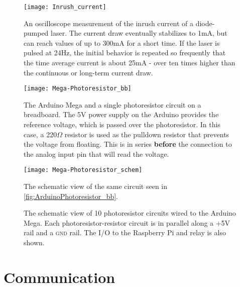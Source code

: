 \documentclass[11pt,oneside,final,letterpaper]{memoir}
\begin{document}
\begin{figure}[H]
    \centering
    \texttt{[image: Inrush\_current]}
    \caption[Oscilloscope measurement of inrush current]{
        An oscilloscope measurement of the inrush current of a diode-pumped laser.  The current draw eventually stabilizes to 1mA, but can reach values of up to 300mA for a short time.  If the laser is pulsed at 24Hz, the initial behavior is repeated so frequently that the time average current is about 25mA - over ten times higher than the continuous or long-term current draw.
    } \label{fig:InrushCurrent}
\end{figure}

\begin{figure}[H]
    \centering
    \texttt{[image: Mega-Photoresistor\_bb]}
    \caption[Arduino and Photoresistor on a Breadboard]{
        The Arduino Mega and a single photoresistor circuit on a breadboard.  The 5V power supply on the Arduino provides the reference voltage, which is passed over the photoresistor.  In this case, a 220$\Omega{}$ resistor is used as the pulldown resistor that prevents the voltage from floating.  This is in series \textbf{before} the connection to the analog input pin that will read the voltage.
    } \label{fig:ArduinoPhotoresistor_bb}
\end{figure}

\begin{figure}[H]
    \centering
    \texttt{[image: Mega-Photoresistor\_schem]}
    \caption[Arduino and Photoresistor Schematic]{
        The schematic view of the same circuit seen in \autoref{fig:ArduinoPhotoresistor_bb}.
    } \label{fig:ArduinoPhotoresistor_schem}
\end{figure}

\begin{figure}[H]
        \caption[The schematic view of 10 photoresistor circuits wired to the Arduino Mega.]{
            The schematic view of 10 photoresistor circuits wired to the Arduino Mega.  Each photoresistor-resistor circuit is in parallel along a +5V rail and a \textsc{gnd} rail.  The I/O to the Raspberry Pi and relay is also shown.
        }
\end{figure}

\section*{Communication}
\end{document}
